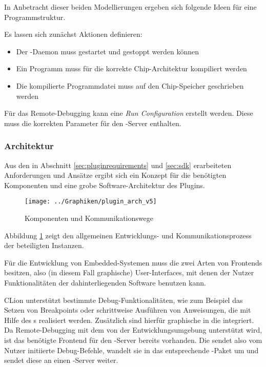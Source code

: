         In Anbetracht dieser beiden Modellierungen ergeben sich folgende Ideen für eine Programmstruktur.

        Es lassen sich zunächst Aktionen definieren:
        \begin{itemize}
            \item Der -Daemon muss gestartet und gestoppt werden können
            \item Ein Programm muss für die korrekte Chip-Architektur kompiliert werden
            \item Die kompilierte Programmdatei muss auf den Chip-Speicher geschrieben werden
        \end{itemize}

        Für das Remote-Debugging kann eine \textit{Run Configuration} erstellt werden. Diese muss die korrekten
        Parameter für den -Server enthalten.

        \subsubsection{Architektur}

        Aus den in Abschnitt \ref{sec:pluginrequirements} und \ref{sec:sdk} erarbeiteten Anforderungen und Ansätze
        ergibt sich ein Konzept für die benötigten Komponenten und eine grobe Software-Architektur des Plugins.

        \begin{figure}[h]
            \centering
            \caption{Komponenten und Kommunikationswege}
            \label{fig:commplugin}
            \texttt{[image: ../Graphiken/plugin\_arch\_v5]}
        \end{figure}

        Abbildung \ref{fig:commplugin} zeigt den allgemeinen Entwicklungs- und Kommunikationsprozess der beteiligten
        Instanzen.

        Für die Entwicklung von Embedded-Systemen muss die  zwei Arten von Frontends besitzen, also (in diesem
        Fall graphische) User-Interfaces, mit denen der Nutzer Funktionalitäten der dahinterliegenden Software benutzen
        kann.

        CLion unterstützt bestimmte Debug-Funktionalitäten, wie zum Beispiel das Setzen von Breakpoints oder
        schrittweise Ausführen von Anweisungen, die mit Hilfe des s realisiert werden. Zusätzlich sind
        hierfür graphische  in die  integriert. Da Remote-Debugging mit dem 
         von der Entwicklungsumgebung unterstützt wird, ist das benötigte Frontend für den -Server bereits
        vorhanden. Die  sendet also vom Nutzer initiierte Debug-Befehle, wandelt sie in das entsprechende
        -Paket um und sendet diese an einen -Server weiter.

